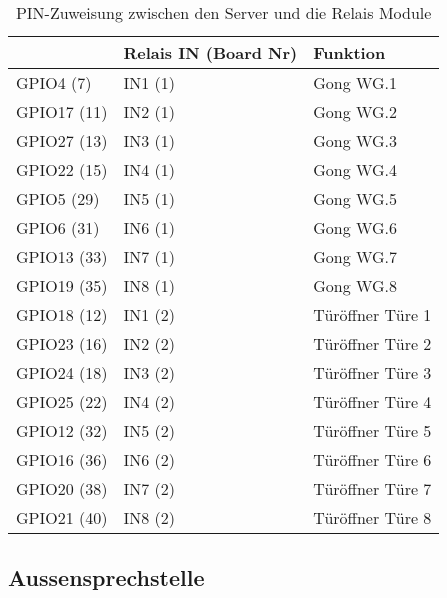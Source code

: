 \begin{table}[]
	\centering
	\label{my-label}
	\begin{tabular}{l|ll}
		\multicolumn{1}{r|}{} \textbf{Pi GPIO (PIN)} & \textbf{Relais IN (Board Nr)} & \textbf{Funktion}  \hspace{60pt}	\\ \hline
		GPIO4 (7)	&	IN1 (1)			& Gong WG.1			\\ \hline
		GPIO17 (11)	&	IN2 (1)			& Gong WG.2			\\ \hline
		GPIO27 (13)	&	IN3 (1)			& Gong WG.3			\\ \hline
		GPIO22 (15)	&	IN4 (1)			& Gong WG.4			\\ \hline
		GPIO5 (29)	&	IN5 (1)			& Gong WG.5			\\ \hline
		GPIO6 (31)	&	IN6 (1)			& Gong WG.6			\\ \hline
		GPIO13 (33)	&	IN7 (1)			& Gong WG.7			\\ \hline
		GPIO19 (35)	&	IN8 (1)			& Gong WG.8			\\ \hline
		GPIO18 (12)	&	IN1 (2)			& Türöffner Türe 1			\\ \hline
		GPIO23 (16)	&	IN2 (2)			& Türöffner Türe 2			\\ \hline
		GPIO24 (18)	&	IN3 (2)			& Türöffner Türe 3			\\ \hline
		GPIO25 (22)	&	IN4 (2)			& Türöffner Türe 4			\\ \hline
		GPIO12 (32)	&	IN5 (2)			& Türöffner Türe 5			\\ \hline
		GPIO16 (36)	&	IN6 (2)			& Türöffner Türe 6			\\ \hline
		GPIO20 (38)	&	IN7 (2)			& Türöffner Türe 7			\\ \hline
		GPIO21 (40)	&	IN8 (2)			& Türöffner Türe 8			\\ \hline
	\end{tabular}
	\caption{PIN-Zuweisung zwischen den Server und die Relais Module}
	\label{tbl:pinroutes}
\end{table}


\subsection{Aussensprechstelle}
\label{sec:chapterexample}

